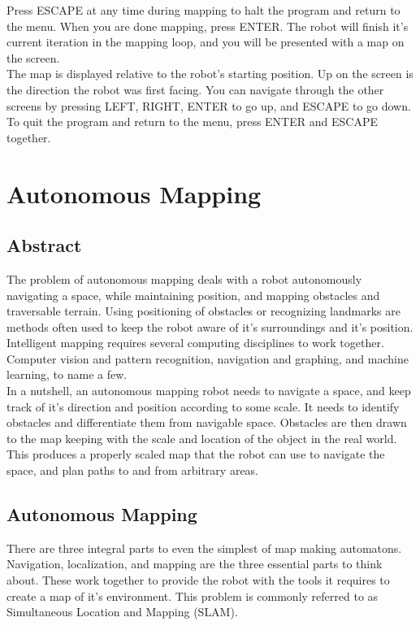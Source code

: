 \documentclass[12pt]{article}
\begin{document}
		Press ESCAPE at any time during mapping to halt the program and return to the menu. When you are done mapping, press ENTER. The robot will finish it's current iteration in the mapping loop, and you will be presented with a map on the screen.\\

		The map is displayed relative to the robot's starting position. Up on the screen is the direction the robot was first facing. You can navigate through the other screens by pressing LEFT, RIGHT, ENTER to go up, and ESCAPE to go down.\\

		To quit the program and return to the menu, press ENTER and ESCAPE together.


    \section{Autonomous Mapping}
	\subsection{Abstract}
		The problem of autonomous mapping deals with a robot autonomously navigating a space, while maintaining position, and mapping obstacles and traversable terrain. Using positioning of obstacles or recognizing landmarks are methods often used to keep the robot aware of it’s surroundings and it’s position. 
Intelligent mapping requires several computing disciplines to work together. Computer vision and pattern recognition, navigation and graphing, and machine learning, to name a few. \\

In a nutshell, an autonomous mapping robot needs to navigate a space, and keep track of it’s direction and position according to some scale. It needs to identify obstacles and differentiate them from navigable space. Obstacles are then drawn to the map keeping with the scale and location of the object in the real world. This produces a properly scaled map that the robot can use to navigate the space, and plan paths to and from arbitrary areas.


	\subsection{Autonomous Mapping}
		There are three integral parts to even the simplest of map making automatons. Navigation, localization, and mapping are the three essential parts to think about. These work together to provide the robot with the tools it requires to create a map of it’s environment. This problem is commonly referred to as Simultaneous Location and Mapping (SLAM).
\end{document}
